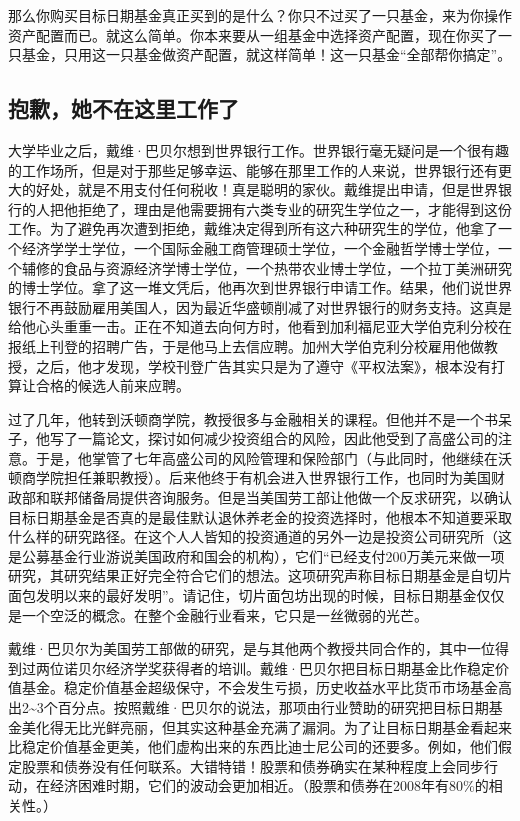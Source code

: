 那么你购买目标日期基金真正买到的是什么？你只不过买了一只基金，来为你操作资产配置而已。就这么简单。你本来要从一组基金中选择资产配置，现在你买了一只基金，只用这一只基金做资产配置，就这样简单！这一只基金“全部帮你搞定”。

\subsection{抱歉，她不在这里工作了}

大学毕业之后，戴维·巴贝尔想到世界银行工作。世界银行毫无疑问是一个很有趣的工作场所，但是对于那些足够幸运、能够在那里工作的人来说，世界银行还有更大的好处，就是不用支付任何税收！真是聪明的家伙。戴维提出申请，但是世界银行的人把他拒绝了，理由是他需要拥有六类专业的研究生学位之一，才能得到这份工作。为了避免再次遭到拒绝，戴维决定得到所有这六种研究生的学位，他拿了一个经济学学士学位，一个国际金融工商管理硕士学位，一个金融哲学博士学位，一个辅修的食品与资源经济学博士学位，一个热带农业博士学位，一个拉丁美洲研究的博士学位。拿了这一堆文凭后，他再次到世界银行申请工作。结果，他们说世界银行不再鼓励雇用美国人，因为最近华盛顿削减了对世界银行的财务支持。这真是给他心头重重一击。正在不知道去向何方时，他看到加利福尼亚大学伯克利分校在报纸上刊登的招聘广告，于是他马上去信应聘。加州大学伯克利分校雇用他做教授，之后，他才发现，学校刊登广告其实只是为了遵守《平权法案》，根本没有打算让合格的候选人前来应聘。

过了几年，他转到沃顿商学院，教授很多与金融相关的课程。但他并不是一个书呆子，他写了一篇论文，探讨如何减少投资组合的风险，因此他受到了高盛公司的注意。于是，他掌管了七年高盛公司的风险管理和保险部门（与此同时，他继续在沃顿商学院担任兼职教授）。后来他终于有机会进入世界银行工作，也同时为美国财政部和联邦储备局提供咨询服务。但是当美国劳工部让他做一个反求研究，以确认目标日期基金是否真的是最佳默认退休养老金的投资选择时，他根本不知道要采取什么样的研究路径。在这个人人皆知的投资通道的另外一边是投资公司研究所（这是公募基金行业游说美国政府和国会的机构），它们“已经支付200万美元来做一项研究，其研究结果正好完全符合它们的想法。这项研究声称目标日期基金是自切片面包发明以来的最好发明”。请记住，切片面包坊出现的时候，目标日期基金仅仅是一个空泛的概念。在整个金融行业看来，它只是一丝微弱的光芒。

戴维·巴贝尔为美国劳工部做的研究，是与其他两个教授共同合作的，其中一位得到过两位诺贝尔经济学奖获得者的培训。戴维·巴贝尔把目标日期基金比作稳定价值基金。稳定价值基金超级保守，不会发生亏损，历史收益水平比货币市场基金高出2\textasciitilde{}3个百分点。按照戴维·巴贝尔的说法，那项由行业赞助的研究把目标日期基金美化得无比光鲜亮丽，但其实这种基金充满了漏洞。为了让目标日期基金看起来比稳定价值基金更美，他们虚构出来的东西比迪士尼公司的还要多。例如，他们假定股票和债券没有任何联系。大错特错！股票和债券确实在某种程度上会同步行动，在经济困难时期，它们的波动会更加相近。（股票和债券在2008年有80\%的相关性。）

